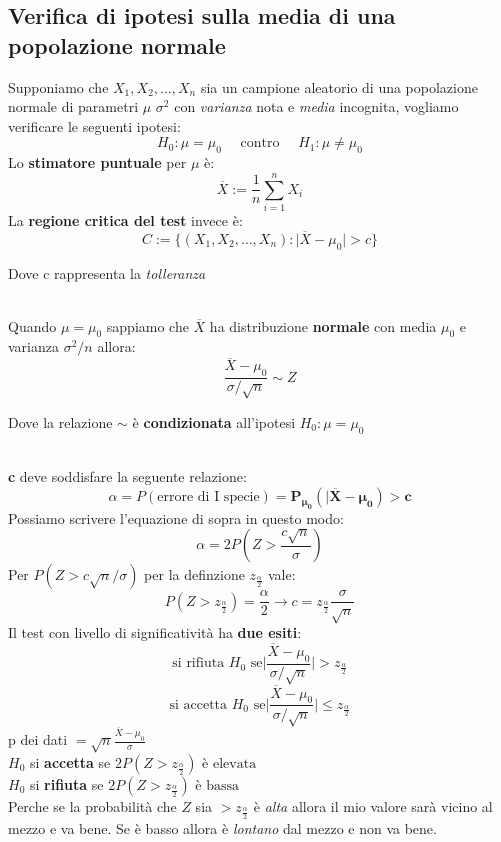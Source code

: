\documentclass[]{article}
\begin{document}
    \subsection{Verifica di ipotesi sulla media di una popolazione normale}
    Supponiamo che $X_1, X_2, \ldots, X_n$ sia un campione aleatorio di una popolazione normale di parametri $\mu$ $\sigma^2$ con \textit{varianza} nota e \textit{media} incognita, vogliamo verificare le seguenti ipotesi:
    \[ H_0 : \mu = \mu_0 \quad \text{ contro } \quad H_1 : \mu \not = \mu_0 \]
    Lo \textbf{stimatore puntuale} per $\mu$ è:
    \[ \overline{X} := \frac{1}{n} \sum_{i=1}^{n} X_i \]
    La \textbf{regione critica del test} invece è:
    \[ C := \{ (X_1, X_2, \ldots, X_n) : \rvert \overline{X} - \mu_0 \rvert > c \} \]
    \centerline{Dove c rappresenta la \textit{tolleranza}} \\[2ex]
    Quando $\mu = \mu_0$ sappiamo che $\overline{X}$ ha distribuzione \textbf{normale} con media $\mu_0$ e varianza $\sigma^2 / n$ allora:
    \[ \frac{\overline{X} - \mu_0}{\sigma / \sqrt{n}} \sim Z \]
    \centerline{Dove la relazione $\sim$ è \textbf{condizionata} all'ipotesi $H_0 : \mu = \mu_0$} \\[2ex]
    \textbf{c} deve soddisfare la seguente relazione:
    \[ \alpha = P(\text{errore di I specie}) = \boldsymbol{P_{\mu_0}(\rvert \overline{X} - \mu_0) > c} \]
    Possiamo scrivere l'equazione di sopra in questo modo:
    \[ \alpha = 2P \left( Z > \frac{c \sqrt{n}}{\sigma} \right) \]
    Per $P(Z > c \sqrt{n} / \sigma)$ per la definzione $z_{\frac{\alpha}{2}}$ vale:
    \[ P\left( Z > z_{\frac{\alpha}{2}} \right)= \frac{\alpha}{2} \longrightarrow c = z_{\frac{\alpha}{2}} \frac{\sigma}{\sqrt{n}}\]
    Il test con livello di significatività ha \textbf{due esiti}:
    \[ \text{si rifiuta } H_0 \text{ se} \bigg\rvert \frac{\overline{X} - \mu_0}{\sigma / \sqrt{n}} \bigg\rvert > z_{\frac{\alpha}{2}} \]
    \[ \text{si accetta } H_0 \text{ se} \bigg\rvert \frac{\overline{X} - \mu_0}{\sigma / \sqrt{n}} \bigg\rvert \leq z_{\frac{\alpha}{2}} \]
    p dei dati $= \sqrt{n} \frac{\overline{X} - \mu_0}{\sigma}$ \\[2ex]
    $H_0$ si \textbf{accetta} se $2P(Z > z_{\frac{\alpha}{2}}) \text{ è elevata}$ \\
    $H_0$ si \textbf{rifiuta} se $2P(Z > z_{\frac{\alpha}{2}}) \text{ è bassa}$ \\
    Perche se la probabilità che $Z$ sia $> z_{\frac{\alpha}{2}}$ è \textit{alta} allora il mio valore sarà vicino al mezzo e va bene. Se è basso allora è \textit{lontano} dal mezzo e non va bene.
\end{document}
